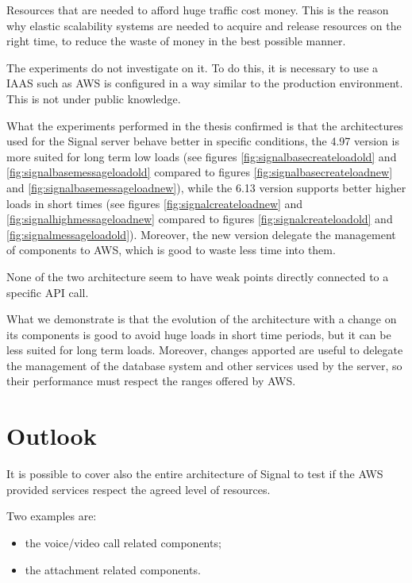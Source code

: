 Resources that are needed to afford huge traffic cost money. This is the reason why elastic scalability systems are needed to acquire and release resources on the right time, to reduce the waste of money in the best possible manner.

The experiments do not investigate on it. To do this, it is necessary to use a IAAS such as AWS is configured in a way similar to the production environment.
This is not under public knowledge.



What the experiments performed in the thesis confirmed is that the architectures used for the Signal server behave better in specific conditions, the 4.97 version is more suited for long term low loads (see figures \vref{fig:signalbasecreateloadold} and \vref{fig:signalbasemessageloadold} compared to figures \vref{fig:signalbasecreateloadnew} and \vref{fig:signalbasemessageloadnew}), while the 6.13 version supports better higher loads in short times (see figures \vref{fig:signalcreateloadnew} and \vref{fig:signalhighmessageloadnew} compared to figures \vref{fig:signalcreateloadold} and \vref{fig:signalmessageloadold}).
Moreover, the new version delegate the management of components to AWS, which is good to waste less time into them. 

None of the two architecture seem to have weak points directly connected to a specific API call.

What we demonstrate is that the evolution of the architecture with a change on its components is good to avoid huge loads in short time periods, but it can be less suited for long term loads.
Moreover, changes apported are useful to delegate the management of the database system and other services used by the server, so their performance must respect the ranges offered by AWS.

\section{Outlook\label{sec:outlook}}

It is possible to cover also the entire architecture of Signal to test if the AWS provided services respect the agreed level of resources.

Two examples are:
\begin{itemize}
    \item the voice/video call related components;
    \item the attachment related components.
\end{itemize}

